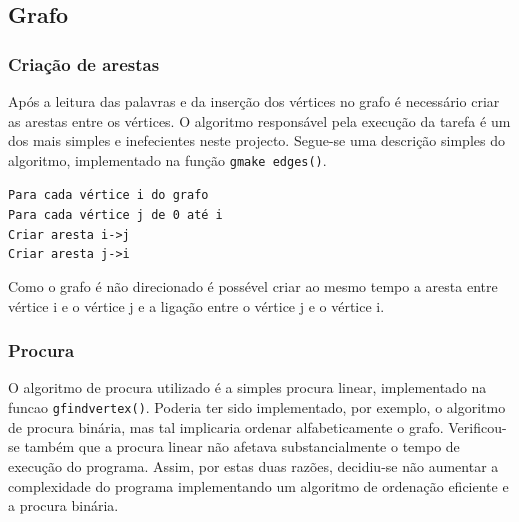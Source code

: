 \documentclass[portuguese, a4paper]{article}
\newcommand\tu[0]{\textunderscore}
\begin{document}
	\subsection{Grafo}
	\subsubsection{Criação de arestas}
	\par
	Após a leitura das palavras e da inserção dos vértices no grafo é necessário
	criar as arestas entre os vértices. O algoritmo responsável pela execução
	da tarefa é um dos mais simples e inefecientes neste projecto. Segue-se uma
	descrição simples do algoritmo, implementado na função \texttt{g\tu make\tu
	edges()}.

	\par\null\par
	\texttt{Para cada vértice i do grafo}\\
	\indent\indent\texttt{Para cada vértice j de 0 até i}\\
	\indent\indent\indent\texttt{Criar aresta i->j}\\
	\indent\indent\indent\texttt{Criar aresta j->i}\\

	\par
	Como o grafo é não direcionado é possével criar ao mesmo tempo a aresta
	entre vértice i e o vértice j e a ligação entre o vértice j e o vértice i.
	\subsubsection{Procura}
	\par
	O algoritmo de procura utilizado é a simples procura linear, implementado
	na funcao \texttt{g\tu find\tu vertex()}. Poderia ter sido implementado,
	por exemplo, o algoritmo de procura binária, mas tal implicaria ordenar
	alfabeticamente o grafo. Verificou-se também que a procura linear não
	afetava substancialmente o tempo de execução do programa. Assim, por estas
	duas razões, decidiu-se não aumentar a complexidade do programa
	implementando um algoritmo de ordenação eficiente e a procura binária.
\end{document}
